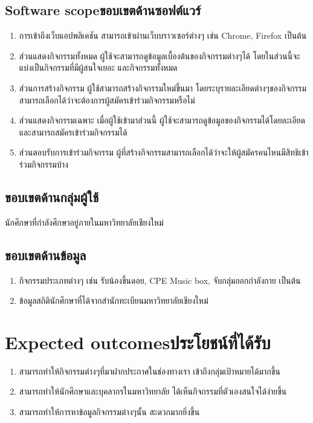 \subsection{\ifenglish Software scope\else ขอบเขตด้านซอฟต์แวร์\fi}
\begin{enumerate}
    \item การเข้าถึงเว็บแอปพลิเคชัน สามารถเข้าผ่านเว็บบราวเซอร์ต่างๆ เช่น Chrome, Firefox เป็นต้น
    \item ส่วนแสดงกิจกรรมทั้งหมด ผู้ใช้จะสามารถดูข้อมูลเบื้องต้นของกิจกรรมต่างๆได้ โดยในส่วนนี้จะแบ่งเป็นกิจกรรมที่มีผู้สนใจเยอะ และกิจกรรมทั้งหมด
    \item ส่วนการสร้างกิจกรรม ผู้ใช้สามารถสร้างกิจกรรมใหม่ขึ้นมา โดยระบุรายละเอียดต่างๆของกิจกรรม สามารถเลือกได้ว่าจะต้องการผู้สมัครเข้าร่วมกิจกรรมหรือไม่
    \item ส่วนแสดงกิจกรรมเฉพาะ เมื่อผู้ใช้เข้ามาส่วนนี้ ผู้ใช้จะสามารถดูข้อมูลของกิจกรรมได้โดยละเอียด และสามารถสมัครเข้าร่วมกิจกรรมได้
    \item ส่วนตอบรับการเข้าร่วมกิจกรรม ผู้ที่สร้างกิจกรรมสามารถเลือกได้ว่าจะให้ผู้สมัครคนไหนมีสิทธิเข้าร่วมกิจกรรมบ้าง
\end{enumerate}

\subsection{ขอบเขตด้านกลุ่มผู้ใช้}
นักศึกษาที่กำลังศึกษาอยู่ภายในมหาวิทยาลัยเชียงใหม่

\subsection{ขอบเขตด้านข้อมูล}
\begin{enumerate}
    \item กิจกรรมประเภทต่างๆ เช่น รับน้องขึ้นดอย, CPE Music box, จับกลุ่มออกกำลังกาย เป็นต้น
    \item ข้อมูลสถิตินักศึกษาที่ได้จากสำนักทะเบียนมหาวิทยาลัยเชียงใหม่
\end{enumerate}

\section{\ifenglish Expected outcomes\else ประโยชน์ที่ได้รับ\fi}
\begin{enumerate}
    \item สามารถทำให้กิจกรรมต่างๆที่มาฝากประกาศในช่องทางเรา เข้าถึงกลุ่มเป้าหมายได้มากขึ้น
    \item สามารถทำให้นักศึกษาและบุคลากรในมหาวิทยาลัย ได้เห็นกิจกรรมที่ตัวเองสนใจได้ง่ายขึ้น
    \item สามารถทำให้การหาข้อมูลกิจกรรมต่างๆนั้น สะดวกมากยิ่งขึ้น
\end{enumerate}

